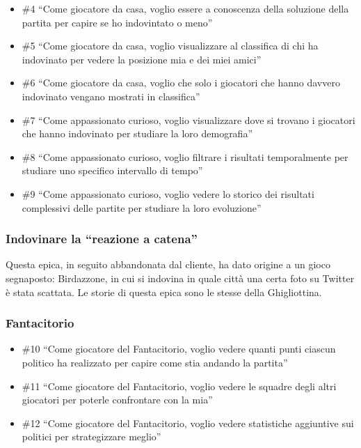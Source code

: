 \documentclass{article}
\begin{document}
\begin{itemize}
	\item \#4 ``Come giocatore da casa, voglio essere a conoscenza della soluzione
	      della partita per capire se ho indovintato o meno''
	\item \#5 ``Come giocatore da casa, voglio visualizzare al classifica di chi ha
	      indovinato per vedere la posizione mia e dei miei amici''
	\item \#6 ``Come giocatore da casa, voglio che solo i giocatori che hanno davvero
	      indovinato vengano mostrati in classifica''
	\item \#7 ``Come appassionato curioso, voglio visualizzare dove si trovano i
	      giocatori che hanno indovinato per studiare la loro demografia''
	\item \#8 ``Come appassionato curioso, voglio filtrare i risultati temporalmente
	      per studiare uno specifico intervallo di tempo''
	\item \#9 ``Come appassionato curioso, voglio vedere lo storico dei risultati
	      complessivi delle partite per studiare la loro evoluzione''
\end{itemize}

\subsubsection{Indovinare la ``reazione a catena''}

Questa epica, in seguito abbandonata dal cliente, ha dato origine a un gioco
segnaposto: Birdazzone, in cui si indovina in quale città una certa foto su
Twitter è stata scattata. Le storie di questa epica sono le stesse della
Ghigliottina.

\subsubsection{Fantacitorio}

\begin{itemize}
	\item \#10 ``Come giocatore del Fantacitorio, voglio vedere quanti punti ciascun
	      politico ha realizzato per capire come stia andando la partita''
	\item \#11 ``Come giocatore del Fantacitorio, voglio vedere le squadre degli altri
	      giocatori per poterle confrontare con la mia''
	\item \#12 ``Come giocatore del Fantacitorio, voglio vedere statistiche aggiuntive
	      sui politici per strategizzare meglio''
\end{itemize}
\end{document}
